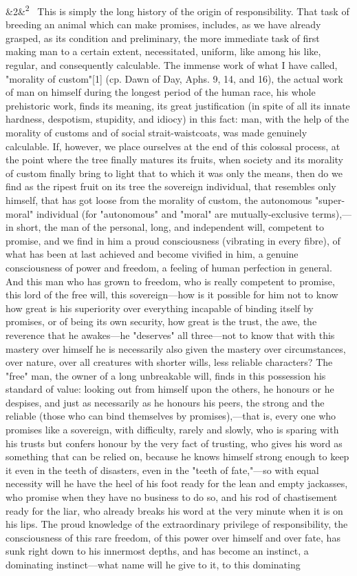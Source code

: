 \documentclass[12pt]{article}
\newcommand{\para}[1][]{\par\noindent\ifx&#1&\else\textsuperscript{\footnotesize #1}~\fi}
\begin{document}
\para[2] This is simply the long history of the origin of responsibility. That task of breeding an animal which can make promises, includes, as we have already grasped, as its condition and preliminary, the more immediate task of first making man to a certain extent, necessitated, uniform, like among his like, regular, and consequently calculable. The immense work of what I have called, "morality of custom"[1] (cp. Dawn of Day, Aphs. 9, 14, and 16), the actual work of man on himself during the longest period of the human race, his whole prehistoric work, finds its meaning, its great justification (in spite of all its innate hardness, despotism, stupidity, and idiocy) in this fact: man, with the help of the morality of customs and of social strait-waistcoats, was made genuinely calculable. If, however, we place ourselves at the end of this colossal process, at the point where the tree finally matures its fruits, when society and its morality of custom finally bring to light that to which it was only the means, then do we find as the ripest fruit on its tree the sovereign individual, that resembles only himself, that has got loose from the morality of custom, the autonomous "super-moral" individual (for "autonomous" and "moral" are mutually-exclusive terms),---in short, the man of the personal, long, and independent will, competent to promise, and we find in him a proud consciousness (vibrating in every fibre), of what has been at last achieved and become vivified in him, a genuine consciousness of power and freedom, a feeling of human perfection in general. And this man who has grown to freedom, who is really competent to promise, this lord of the free will, this sovereign---how is it possible for him not to know how great is his superiority over everything incapable of binding itself by promises, or of being its own security, how great is the trust, the awe, the reverence that he awakes---he "deserves" all three---not to know that with this mastery over himself he is necessarily also given the mastery over circumstances, over nature, over all creatures with shorter wills, less reliable characters? The "free" man, the owner of a long unbreakable will, finds in this possession his standard of value: looking out from himself upon the others, he honours or he despises, and just as necessarily as he honours his peers, the strong and the reliable (those who can bind themselves by promises),---that is, every one who promises like a sovereign, with difficulty, rarely and slowly, who is sparing with his trusts but confers honour by the very fact of trusting, who gives his word as something that can be relied on, because he knows himself strong enough to keep it even in the teeth of disasters, even in the "teeth of fate,"---so with equal necessity will he have the heel of his foot ready for the lean and empty jackasses, who promise when they have no business to do so, and his rod of chastisement ready for the liar, who already breaks his word at the very minute when it is on his lips. The proud knowledge of the extraordinary privilege of responsibility, the consciousness of this rare freedom, of this power over himself and over fate, has sunk right down to his innermost depths, and has become an instinct, a dominating instinct---what name will he give to it, to this dominating 
\end{document}
